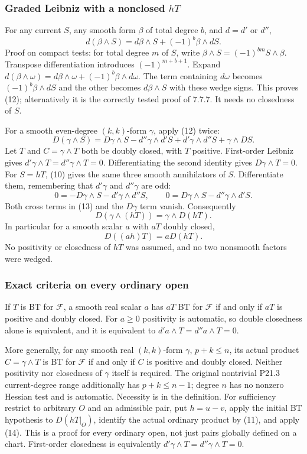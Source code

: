\documentclass[11pt]{article}
\begin{document}
\subsubsection{Graded Leibniz with a nonclosed \(hT\)}

For any current \(S\), any smooth form \(\beta\) of total degree \(b\), and \(d=d'\) or \(d''\),
\[
 d(\beta\wedge S)=d\beta\wedge S+(-1)^b\beta\wedge dS.
 \tag{12}
\]
Proof on compact tests: for total degree \(m\) of \(S\), write \(\beta\wedge S=(-1)^{bm}S\wedge\beta\). Transpose differentiation introduces \((-1)^{m+b+1}\). Expand \(d(\beta\wedge\omega)=d\beta\wedge\omega+(-1)^b\beta\wedge d\omega\). The term containing \(d\omega\) becomes \((-1)^b\beta\wedge dS\) and the other becomes \(d\beta\wedge S\) with these wedge signs. This proves (12); alternatively it is the correctly tested proof of 7.7.7. It needs no closedness of \(S\).

For a smooth even-degree \((k,k)\)-form \(\gamma\), apply (12) twice:
\[
 D(\gamma\wedge S)=D\gamma\wedge S
 -d''\gamma\wedge d'S+d'\gamma\wedge d''S+\gamma\wedge DS.
 \tag{13}
\]
Let \(T\) and \(C=\gamma\wedge T\) both be doubly closed, with \(T\) positive. First-order Leibniz gives \(d'\gamma\wedge T=d''\gamma\wedge T=0\). Differentiating the second identity gives \(D\gamma\wedge T=0\). For \(S=hT\), (10) gives the same three smooth annihilators of \(S\). Differentiate them, remembering that \(d'\gamma\) and \(d''\gamma\) are odd:
\[
 0=-D\gamma\wedge S-d'\gamma\wedge d''S,
 \qquad
 0=D\gamma\wedge S-d''\gamma\wedge d'S.
\]
Both cross terms in (13) and the \(D\gamma\) term vanish. Consequently
\[
 D(\gamma\wedge(hT))=\gamma\wedge D(hT).\tag{14}
\]
In particular for a smooth scalar \(a\) with \(aT\) doubly closed,
\[
 D((ah)T)=aD(hT).\tag{15}
\]
No positivity or closedness of \(hT\) was assumed, and no two nonsmooth factors were wedged.

\subsubsection{Exact criteria on every ordinary open}

If \(T\) is BT for \(\mathcal F\), a smooth real scalar \(a\) has \(aT\) BT for \(\mathcal F\) if and only if \(aT\) is positive and doubly closed. For \(a\geq0\) positivity is automatic, so double closedness alone is equivalent, and it is equivalent to \(d'a\wedge T=d''a\wedge T=0\).

More generally, for any smooth real \((k,k)\)-form \(\gamma\), \(p+k\leq n\), its actual product \(C=\gamma\wedge T\) is BT for \(\mathcal F\) if and only if \(C\) is positive and doubly closed. Neither positivity nor closedness of \(\gamma\) itself is required. The original nontrivial P21.3 current-degree range additionally has \(p+k\leq n-1\); degree \(n\) has no nonzero Hessian test and is automatic. Necessity is in the definition. For sufficiency restrict to arbitrary \(O\) and an admissible pair, put \(h=u-v\), apply the initial BT hypothesis to \(D(hT|_O)\), identify the actual ordinary product by (11), and apply (14). This is a proof for every ordinary open, not just pairs globally defined on a chart. First-order closedness is equivalently \(d'\gamma\wedge T=d''\gamma\wedge T=0\).
\end{document}
